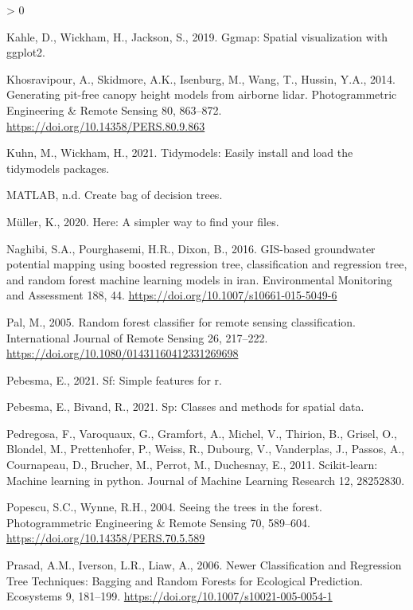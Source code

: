 \documentclass[
]{article}
\newlength{\cslhangindent}
\newenvironment{CSLReferences}[2] %
 {%
  \setlength{\parindent}{0pt}
  \ifodd #1 \everypar{\setlength{\hangindent}{\cslhangindent}}\ignorespaces\fi
  \ifnum #2 > 0
  \setlength{\parskip}{#2\baselineskip}
  \fi
 }%
 {}
\begin{document}
\begin{CSLReferences}{1}{0}
\leavevmode\hypertarget{ref-R-ggmap}{}%
Kahle, D., Wickham, H., Jackson, S., 2019. Ggmap: Spatial visualization with ggplot2.

\leavevmode\hypertarget{ref-khosravipour2014}{}%
Khosravipour, A., Skidmore, A.K., Isenburg, M., Wang, T., Hussin, Y.A., 2014. Generating pit-free canopy height models from airborne lidar. Photogrammetric Engineering \& Remote Sensing 80, 863--872. \url{https://doi.org/10.14358/PERS.80.9.863}

\leavevmode\hypertarget{ref-R-tidymodels}{}%
Kuhn, M., Wickham, H., 2021. Tidymodels: Easily install and load the tidymodels packages.

\leavevmode\hypertarget{ref-matlab}{}%
MATLAB, n.d. Create bag of decision trees.

\leavevmode\hypertarget{ref-R-here}{}%
Müller, K., 2020. Here: A simpler way to find your files.

\leavevmode\hypertarget{ref-naghibi2016}{}%
Naghibi, S.A., Pourghasemi, H.R., Dixon, B., 2016. GIS-based groundwater potential mapping using boosted regression tree, classification and regression tree, and random forest machine learning models in iran. Environmental Monitoring and Assessment 188, 44. \url{https://doi.org/10.1007/s10661-015-5049-6}

\leavevmode\hypertarget{ref-pal2005}{}%
Pal, M., 2005. Random forest classifier for remote sensing classification. International Journal of Remote Sensing 26, 217--222. \url{https://doi.org/10.1080/01431160412331269698}

\leavevmode\hypertarget{ref-R-sf}{}%
Pebesma, E., 2021. Sf: Simple features for r.

\leavevmode\hypertarget{ref-R-sp}{}%
Pebesma, E., Bivand, R., 2021. Sp: Classes and methods for spatial data.

\leavevmode\hypertarget{ref-scikit-learn}{}%
Pedregosa, F., Varoquaux, G., Gramfort, A., Michel, V., Thirion, B., Grisel, O., Blondel, M., Prettenhofer, P., Weiss, R., Dubourg, V., Vanderplas, J., Passos, A., Cournapeau, D., Brucher, M., Perrot, M., Duchesnay, E., 2011. Scikit-learn: Machine learning in python. Journal of Machine Learning Research 12, 28252830.

\leavevmode\hypertarget{ref-popescu2004}{}%
Popescu, S.C., Wynne, R.H., 2004. Seeing the trees in the forest. Photogrammetric Engineering \& Remote Sensing 70, 589--604. \url{https://doi.org/10.14358/PERS.70.5.589}

\leavevmode\hypertarget{ref-prasad2006}{}%
Prasad, A.M., Iverson, L.R., Liaw, A., 2006. Newer Classification and Regression Tree Techniques: Bagging and Random Forests for Ecological Prediction. Ecosystems 9, 181--199. \url{https://doi.org/10.1007/s10021-005-0054-1}


\end{CSLReferences}
\end{document}

